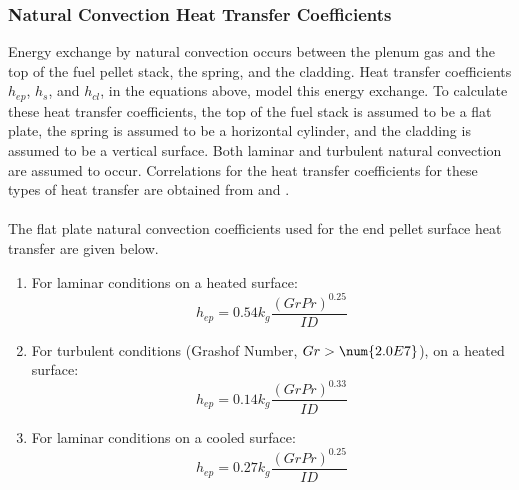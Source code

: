 \subsubsection{Natural Convection Heat Transfer Coefficients}\label{section:natural-convection-heat-transfer-coefficients}
Energy exchange by natural convection occurs between the plenum gas and the top of the fuel pellet
stack, the spring, and the cladding. Heat transfer coefficients \(h_{ep}\), \(h_{s}\), and
\(h_{cl}\), in the equations above, model this energy exchange.  To calculate these heat transfer
coefficients, the top of the fuel stack is assumed to be a flat plate, the spring is assumed to be a
horizontal cylinder, and the cladding is assumed to be a vertical surface. Both laminar and
turbulent natural convection are assumed to occur.  Correlations for the heat transfer coefficients
for these types of heat transfer are obtained from \cite{ref:Kreith1964a} and
\cite{ref:McAdams1954b}.
\\
\\
The flat plate natural convection coefficients used for the end pellet surface heat transfer are
given below.
\begin{enumerate}
    \item
      For laminar conditions on a heated surface:
        \begin{equation}
            \label{eq:plate_natural_convection_laminar_heated_surface}
            h_{ep} = 0.54k_{g}\frac{\left( GrPr \right)^{0.25}}{ID}
        \end{equation}
    \item
        For turbulent conditions (Grashof Number, \(Gr>\num{2.0E7}\)), on a heated surface:
        \begin{equation}
            \label{eq:plate_natural_convection_turbulent_heated_surface}
            h_{ep} = 0.14k_{g}\frac{\left( GrPr \right)^{0.33}}{ID}
        \end{equation}
    \item
      For laminar conditions on a cooled surface:
        \begin{equation}
            \label{eq:plate_natural_convection_laminar_cooled_surface}
            h_{ep} = 0.27k_{g}\frac{\left( GrPr \right)^{0.25}}{ID}
        \end{equation}
\end{enumerate}

